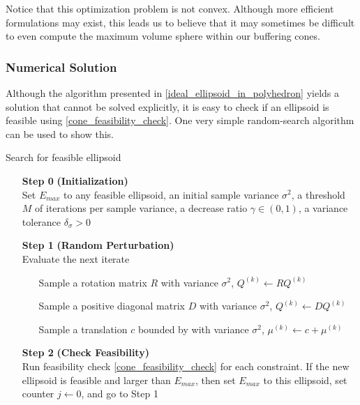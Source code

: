 \documentclass{article}
\theoremstyle{case}
\newcommand{\qk}{{Q^{(k)}}}
\newcommand{\centerk}{{\mu^{(k)}}}
\begin{document}
Notice that this optimization problem is not convex.
Although more efficient formulations may exist, this leads us to believe that it may sometimes be difficult to even compute the maximum volume sphere within our buffering cones.


\subsubsection{Numerical Solution}

Although the algorithm presented in \cref{ideal_ellipsoid_in_polyhedron} yields a solution that cannot be solved explicitly, it is easy to check if an ellipsoid is feasible using \cref{cone_feasibility_check}.
One very simple random-search algorithm can be used to show this.

\begin{algorithm}[H]
    \caption{Search for feasible ellipsoid}
    \label{constrained_dfo}
    \begin{itemize}
        \item[\textbf{Step 0}] \textbf{(Initialization)} \\
                Set $E_{max}$ to any feasible ellipsoid, 
                an initial sample variance $\sigma^2$, 
                a threshold $M$ of iterations per sample variance, 
                a decrease ratio $\gamma \in (0, 1)$, 
                a variance tolerance $\delta_{\sigma} > 0$
        
        \item[\textbf{Step 1}] \textbf{(Random Perturbation)} \\
            Evaluate the next iterate \begin{itemize}
                \item[] Sample a rotation matrix $R$ with variance $\sigma^2$, $\qk \gets R \qk$
                \item[] Sample a positive diagonal matrix $D$ with variance $\sigma^2$, $\qk \gets D \qk$
                \item[] Sample a translation $c$ bounded by with variance $\sigma^2$, $\centerk \gets c + \centerk$
            \end{itemize}
        
        \item[\textbf{Step 2}] \textbf{(Check Feasibility)} \\
            Run feasibility check \cref{cone_feasibility_check} for each constraint.
            If the new ellipsoid is feasible and larger than $E_{max}$, then 
            	set $E_{max}$ to this ellipsoid,
            	set counter $j \gets 0$, and
            	go to Step 1
        

\end{itemize}
\end{algorithm}
\end{document}
